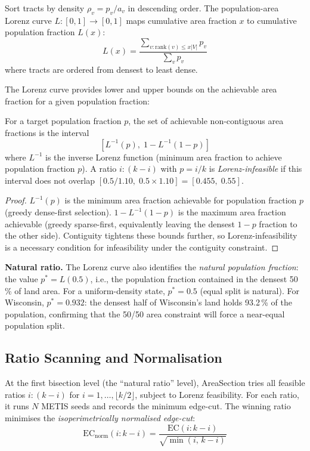 \begin{definition}
Sort tracts by density $\rho_v = p_v / a_v$ in descending order.
The population-area Lorenz curve $L : [0,1] \to [0,1]$ maps cumulative area
fraction $x$ to cumulative population fraction $L(x)$:
\[
  L(x) = \frac{\sum_{v : \mathrm{rank}(v) \leq x|V|} p_v}{\sum_v p_v}
\]
where tracts are ordered from densest to least dense.
\end{definition}

The Lorenz curve provides lower and upper bounds on the achievable area fraction
for a given population fraction:

\begin{proposition}
For a target population fraction $p$, the set of achievable non-contiguous
area fractions is the interval
\[
  [L^{-1}(p),\; 1 - L^{-1}(1-p)]
\]
where $L^{-1}$ is the inverse Lorenz function (minimum area fraction to
achieve population fraction $p$).
A ratio $i:(k-i)$ with $p = i/k$ is \emph{Lorenz-infeasible} if this interval
does not overlap $[0.5/1.10,\; 0.5 \times 1.10] = [0.455,\; 0.55]$.
\end{proposition}

\begin{proof}
$L^{-1}(p)$ is the minimum area fraction achievable for population fraction $p$
(greedy dense-first selection). $1 - L^{-1}(1-p)$ is the maximum area fraction
achievable (greedy sparse-first, equivalently leaving the densest $1-p$
fraction to the other side). Contiguity tightens these bounds further, so
Lorenz-infeasibility is a necessary condition for infeasibility under the
contiguity constraint.
\end{proof}

\noindent\textbf{Natural ratio.}
The Lorenz curve also identifies the \emph{natural population fraction}: the
value $p^* = L(0.5)$, i.e., the population fraction contained in the densest
50\,\% of land area.
For a uniform-density state, $p^* = 0.5$ (equal split is natural).
For Wisconsin, $p^* = 0.932$: the densest half of Wisconsin's land holds 93.2\,\%
of the population, confirming that the 50/50 area constraint will force a
near-equal population split.

\subsection{Ratio Scanning and Normalisation}

At the first bisection level (the ``natural ratio'' level), AreaSection tries
all feasible ratios $i:(k-i)$ for $i = 1, \ldots, \lfloor k/2 \rfloor$,
subject to Lorenz feasibility.
For each ratio, it runs $N$ METIS seeds and records the minimum edge-cut.
The winning ratio minimises the \emph{isoperimetrically normalised edge-cut}:
\[
  \mathrm{EC}_{\text{norm}}(i:k-i) = \frac{\mathrm{EC}(i:k-i)}{\sqrt{\min(i,\, k-i)}}
\]

